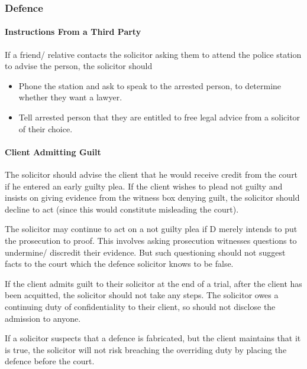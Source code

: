 \documentclass[
]{article}
\providecommand{\tightlist}{%
  \setlength{\itemsep}{0pt}\setlength{\parskip}{0pt}}
\begin{document}
\hypertarget{defence}{%
\subsubsection{Defence}\label{defence}}

\hypertarget{instructions-from-a-third-party}{%
\paragraph{Instructions From a Third
Party}\label{instructions-from-a-third-party}}

If a friend/ relative contacts the solicitor asking them to attend the
police station to advise the person, the solicitor should

\begin{itemize}
\tightlist
\item
  Phone the station and ask to speak to the arrested person, to
  determine whether they want a lawyer.
\item
  Tell arrested person that they are entitled to free legal advice from
  a solicitor of their choice.
\end{itemize}

\hypertarget{client-admitting-guilt}{%
\paragraph{Client Admitting Guilt}\label{client-admitting-guilt}}

The solicitor should advise the client that he would receive credit from
the court if he entered an early guilty plea. If the client wishes to
plead not guilty and insists on giving evidence from the witness box
denying guilt, the solicitor should decline to act (since this would
constitute misleading the court).

The solicitor may continue to act on a not guilty plea if D merely
intends to put the prosecution to proof. This involves asking
prosecution witnesses questions to undermine/ discredit their evidence.
But such questioning should not suggest facts to the court which the
defence solicitor knows to be false.

If the client admits guilt to their solicitor at the end of a trial,
after the client has been acquitted, the solicitor should not take any
steps. The solicitor owes a continuing duty of confidentiality to their
client, so should not disclose the admission to anyone.

If a solicitor suspects that a defence is fabricated, but the client
maintains that it is true, the solicitor will not risk breaching the
overriding duty by placing the defence before the court.
\end{document}

